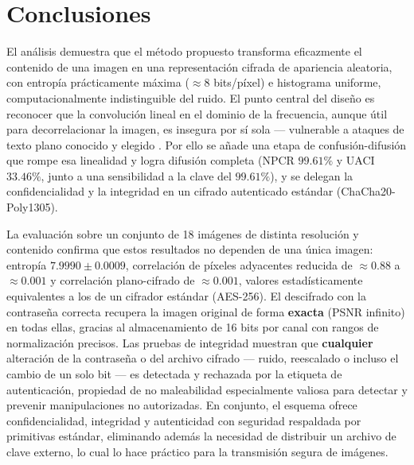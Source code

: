 \documentclass{llncs}
\begin{document}
\section{Conclusiones}

El an\'alisis demuestra que el m\'etodo propuesto transforma eficazmente el
contenido de una imagen en una representaci\'on cifrada de apariencia
aleatoria, con entrop\'ia pr\'acticamente m\'axima ($\approx 8$ bits/p\'ixel)
e histograma uniforme, computacionalmente indistinguible del ruido. El punto
central del dise\~no es reconocer que la convoluci\'on lineal en el dominio
de la frecuencia, aunque \'util para decorrelacionar la imagen, es insegura
por s\'i sola --- vulnerable a ataques de texto plano conocido y elegido
\cite{peng,frauel}. Por ello se a\~nade una etapa de confusi\'on-difusi\'on
que rompe esa linealidad y logra difusi\'on completa (NPCR $99.61\%$ y UACI
$33.46\%$, junto a una sensibilidad a la clave del $99.61\%$), y se delegan
la confidencialidad y la integridad en un cifrado autenticado est\'andar
(ChaCha20-Poly1305).

La evaluaci\'on sobre un conjunto de 18 im\'agenes de distinta resoluci\'on y
contenido confirma que estos resultados no dependen de una \'unica imagen:
entrop\'ia $7.9990 \pm 0.0009$, correlaci\'on de p\'ixeles adyacentes
reducida de $\approx 0.88$ a $\approx 0.001$ y correlaci\'on plano-cifrado de
$\approx 0.001$, valores estad\'isticamente equivalentes a los de un cifrador
est\'andar (AES-256). El descifrado con la contrase\~na correcta recupera la
imagen original de forma \textbf{exacta} (PSNR infinito) en todas ellas,
gracias al almacenamiento de 16 bits por canal con rangos de normalizaci\'on
precisos. Las pruebas de integridad
muestran que \textbf{cualquier} alteraci\'on de la contrase\~na o del
archivo cifrado --- ruido, reescalado o incluso el cambio de un solo bit ---
es detectada y rechazada por la etiqueta de autenticaci\'on, propiedad de no
maleabilidad especialmente valiosa para detectar y prevenir manipulaciones
no autorizadas. En conjunto, el esquema ofrece confidencialidad, integridad
y autenticidad con seguridad respaldada por primitivas est\'andar, eliminando
adem\'as la necesidad de distribuir un archivo de clave externo, lo cual lo
hace pr\'actico para la transmisi\'on segura de im\'agenes.
\end{document}
